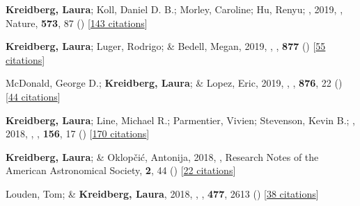 \item[{\color{numcolor}\scriptsize16}] \textbf{Kreidberg, Laura}; Koll, Daniel D. B.; Morley, Caroline; Hu, Renyu; \etal, 2019, , Nature, \textbf{573}, 87 () [\href{https://ui.adsabs.harvard.edu/abs/2019Natur.573...87K}{143 citations}]

\item[{\color{numcolor}\scriptsize15}] \textbf{Kreidberg, Laura}; Luger, Rodrigo; \& Bedell, Megan, 2019, , \apj, \textbf{877} () [\href{https://ui.adsabs.harvard.edu/abs/2019ApJ...877L..15K}{55 citations}]

\item[{\color{numcolor}\scriptsize14}] McDonald, George D.; \textbf{Kreidberg, Laura}; \& Lopez, Eric, 2019, , \apj, \textbf{876}, 22 () [\href{https://ui.adsabs.harvard.edu/abs/2019ApJ...876...22M}{44 citations}]

\item[{\color{numcolor}\scriptsize13}] \textbf{Kreidberg, Laura}; Line, Michael R.; Parmentier, Vivien; Stevenson, Kevin B.; \etal, 2018, , \aj, \textbf{156}, 17 () [\href{https://ui.adsabs.harvard.edu/abs/2018AJ....156...17K}{170 citations}]

\item[{\color{numcolor}\scriptsize12}] \textbf{Kreidberg, Laura}; \& Oklop{\v{c}}i{\'c}, Antonija, 2018, , Research Notes of the American Astronomical Society, \textbf{2}, 44 () [\href{https://ui.adsabs.harvard.edu/abs/2018RNAAS...2...44K}{22 citations}]

\item[{\color{numcolor}\scriptsize11}] Louden, Tom; \& \textbf{Kreidberg, Laura}, 2018, , \mnras, \textbf{477}, 2613 () [\href{https://ui.adsabs.harvard.edu/abs/2018MNRAS.477.2613L}{38 citations}]

